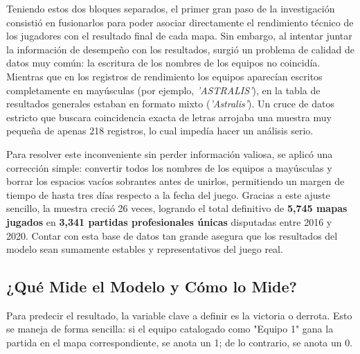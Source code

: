 \documentclass[twocolumn,10pt]{article}
\begin{document}
Teniendo estos dos bloques separados, el primer gran paso de la investigación consistió en fusionarlos para poder asociar directamente el rendimiento técnico de los jugadores con el resultado final de cada mapa. Sin embargo, al intentar juntar la información de desempeño con los resultados, surgió un problema de calidad de datos muy común: la escritura de los nombres de los equipos no coincidía. Mientras que en los registros de rendimiento los equipos aparecían escritos completamente en mayúsculas (por ejemplo, \textit{'ASTRALIS'}), en la tabla de resultados generales estaban en formato mixto (\textit{'Astralis'}). Un cruce de datos estricto que buscara coincidencia exacta de letras arrojaba una muestra muy pequeña de apenas 218 registros, lo cual impedía hacer un análisis serio. 

Para resolver este inconveniente sin perder información valiosa, se aplicó una corrección simple: convertir todos los nombres de los equipos a mayúsculas y borrar los espacios vacíos sobrantes antes de unirlos, permitiendo un margen de tiempo de hasta tres días respecto a la fecha del juego. Gracias a este ajuste sencillo, la muestra creció 26 veces, logrando el total definitivo de \textbf{5,745 mapas jugados} en \textbf{3,341 partidas profesionales únicas} disputadas entre 2016 y 2020. Contar con esta base de datos tan grande asegura que los resultados del modelo sean sumamente estables y representativos del juego real.

\subsection{¿Qué Mide el Modelo y Cómo lo Mide?}

Para predecir el resultado, la variable clave a definir es la victoria o derrota. Esto se maneja de forma sencilla: si el equipo catalogado como "Equipo 1" gana la partida en el mapa correspondiente, se anota un 1; de lo contrario, se anota un 0.
\end{document}
